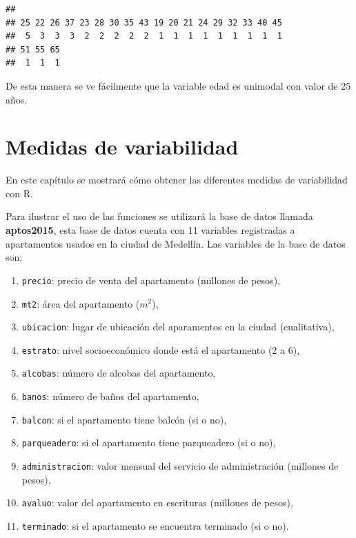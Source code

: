 \documentclass[10pt,]{krantz}
\providecommand{\tightlist}{%
  \setlength{\itemsep}{0pt}\setlength{\parskip}{0pt}}
\let\proglang=\textsf
\begin{document}
\begin{verbatim}
## 
## 25 22 26 37 23 28 30 35 43 19 20 21 24 29 32 33 40 45 
##  5  3  3  3  2  2  2  2  2  1  1  1  1  1  1  1  1  1 
## 51 55 65 
##  1  1  1
\end{verbatim}

De esta manera se ve fácilmente que la variable edad es unimodal con
valor de 25 años.

\chapter{\texorpdfstring{Medidas de variabilidad
\label{varia}}{Medidas de variabilidad }}\label{medidas-de-variabilidad}

En este capítulo se mostrará cómo obtener las diferentes medidas de
variabilidad con \proglang{R}.

Para ilustrar el uso de las funciones se utilizará la base de datos
llamada \textbf{aptos2015}, esta base de datos cuenta con 11 variables
registradas a apartamentos usados en la ciudad de Medellín. Las
variables de la base de datos son:

\begin{enumerate}
\def\labelenumi{\arabic{enumi}.}
\tightlist
\item
  \texttt{precio}: precio de venta del apartamento (millones de pesos),
\item
  \texttt{mt2}: área del apartamento (\(m^2\)),
\item
  \texttt{ubicacion}: lugar de ubicación del aparamentos en la ciudad
  (cualitativa),
\item
  \texttt{estrato}: nivel socioeconómico donde está el apartamento (2 a
  6),
\item
  \texttt{alcobas}: número de alcobas del apartamento,
\item
  \texttt{banos}: número de baños del apartamento,
\item
  \texttt{balcon}: si el apartamento tiene balcón (si o no),
\item
  \texttt{parqueadero}: si el apartamento tiene parqueadero (si o no),
\item
  \texttt{administracion}: valor mensual del servicio de administración
  (millones de pesos),
\item
  \texttt{avaluo}: valor del apartamento en escrituras (millones de
  pesos),
\item
  \texttt{terminado}: si el apartamento se encuentra terminado (si o
  no).
\end{enumerate}
\end{document}
